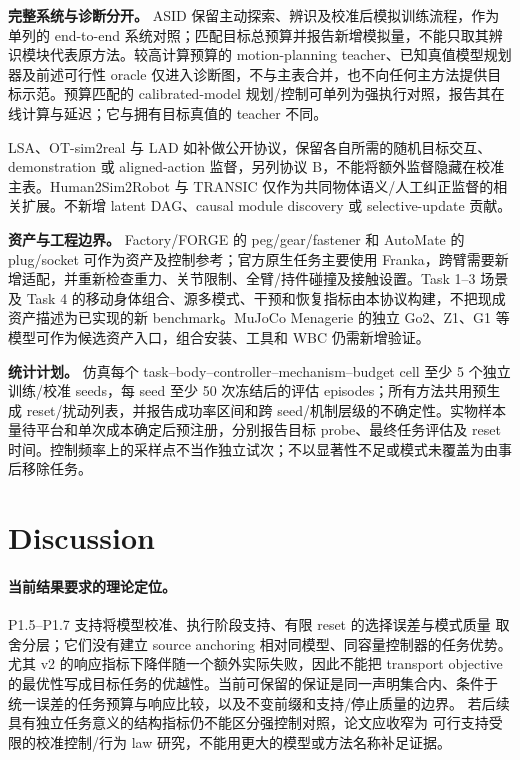 \documentclass[11pt]{article}
\begin{document}
\textbf{完整系统与诊断分开。} ASID 保留主动探索、辨识及校准后模拟训练流程，作为单列的 end-to-end 系统对照；匹配目标总预算并报告新增模拟量，不能只取其辨识模块代表原方法\cite{asid}。较高计算预算的 motion-planning teacher、已知真值模型规划器及前述可行性 oracle 仅进入诊断图，不与主表合并，也不向任何主方法提供目标示范。预算匹配的 calibrated-model 规划/控制可单列为强执行对照，报告其在线计算与延迟；它与拥有目标真值的 teacher 不同。

LSA、OT-sim2real 与 LAD 如补做公开协议，保留各自所需的随机目标交互、demonstration 或 aligned-action 监督，另列协议 B，不能将额外监督隐藏在校准主表\cite{lsa,otreal,lad}。Human2Sim2Robot 与 TRANSIC 仅作为共同物体语义/人工纠正监督的相关扩展\cite{human2sim,transic}。不新增 latent DAG、causal module discovery 或 selective-update 贡献。

\textbf{资产与工程边界。} Factory/FORGE 的 peg/gear/fastener 和 AutoMate 的 plug/socket 可作为资产及控制参考；官方原生任务主要使用 Franka，跨臂需要新增适配，并重新检查重力、关节限制、全臂/持件碰撞及接触设置\cite{isaaclabtasks}。Task 1--3 场景及 Task 4 的移动身体组合、源多模式、干预和恢复指标由本协议构建，不把现成资产描述为已实现的新 benchmark。MuJoCo Menagerie 的独立 Go2、Z1、G1 等模型可作为候选资产入口，组合安装、工具和 WBC 仍需新增验证\cite{menagerie}。

\textbf{统计计划。} 仿真每个 task--body--controller--mechanism--budget cell 至少 5 个独立训练/校准 seeds，每 seed 至少 50 次冻结后的评估 episodes；所有方法共用预生成 reset/扰动列表，并报告成功率区间和跨 seed/机制层级的不确定性。实物样本量待平台和单次成本确定后预注册，分别报告目标 probe、最终任务评估及 reset 时间。控制频率上的采样点不当作独立试次；不以显著性不足或模式未覆盖为由事后移除任务。

\section{Discussion}
\paragraph{当前结果要求的理论定位。}
P1.5--P1.7 支持将模型校准、执行阶段支持、有限 reset 的选择误差与模式质量
取舍分层；它们没有建立 source anchoring 相对同模型、同容量控制器的任务优势。
尤其 v2 的响应指标下降伴随一个额外实际失败，因此不能把 transport objective
的最优性写成目标任务的优越性。当前可保留的保证是同一声明集合内、条件于
统一误差的任务预算与响应比较，以及不变前缀和支持/停止质量的边界。
若后续具有独立任务意义的结构指标仍不能区分强控制对照，论文应收窄为
可行支持受限的校准控制/行为 law 研究，不能用更大的模型或方法名称补足证据。
\end{document}
